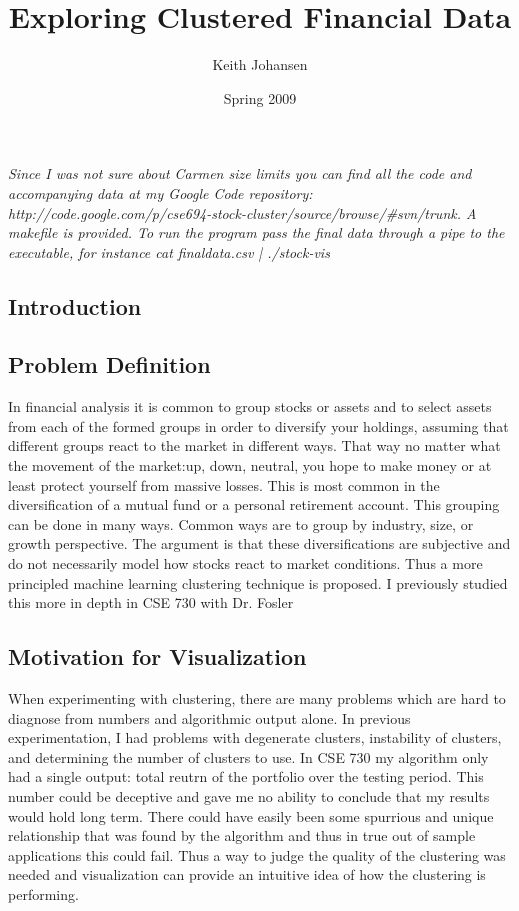 \documentclass{article}
\author{Keith Johansen}
\title{Exploring Clustered Financial Data}
\date{Spring 2009}
\begin{document}
\maketitle


\noindent \textit{Since I was not sure about Carmen size limits you can find all the code and accompanying data at my Google Code repository: http://code.google.com/p/cse694-stock-cluster/source/browse/\#svn/trunk. A makefile is provided.  To run the program pass the final data through a pipe to the executable, for instance cat finaldata.csv | ./stock-vis}
\begin{multicols}{2}
\section{Introduction}
\subsection{Problem Definition}
In financial analysis it is common to group stocks or assets and to select assets from each of the formed groups in order to diversify your holdings, assuming that different groups react to the market in different ways.  That way no matter what the movement of the market:up, down, neutral, you hope to make money or at least protect yourself from massive losses.   This is most common in the diversification of a mutual fund or a personal retirement account.  This grouping can be done in many ways.  Common ways are to group by industry, size, or growth perspective.  The argument is that these diversifications are subjective and do not necessarily model how stocks react to market conditions.  Thus a more principled machine learning clustering technique is proposed. I previously studied this more in depth in CSE 730 with Dr. Fosler

\subsection{Motivation for Visualization}
When experimenting with clustering, there are many problems which are hard to diagnose from numbers and algorithmic output alone.  In previous experimentation, I had problems with degenerate clusters, instability of clusters, and determining the number of clusters to use.  In CSE 730 my algorithm only had a single output: total reutrn of the portfolio over the testing period.  This number could be deceptive and gave me no ability to conclude that my results would hold long term.  There could have easily been some spurrious and unique relationship that was found by the algorithm and thus in true out of sample applications this could fail.  Thus a way to judge the quality of the clustering was needed and visualization can provide an intuitive idea of how the clustering is performing.

\end{multicols}
\end{document}
